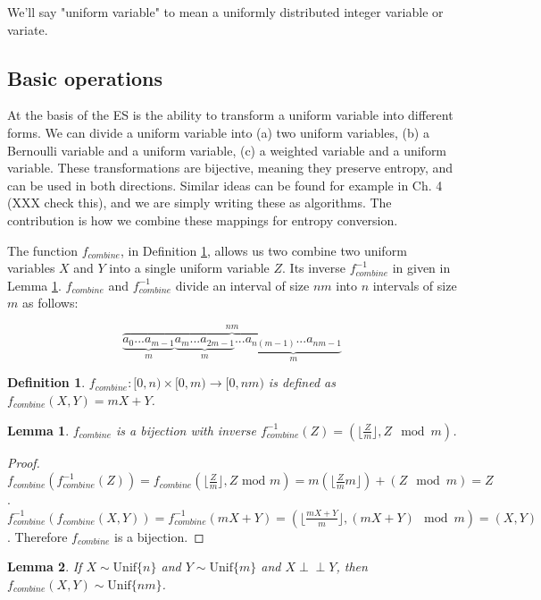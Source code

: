 \documentclass[12pt]{article}
\newtheorem{lemma}{Lemma}
\newtheorem{definition}{Definition}
\newcommand{\indep}{\perp\!\!\!\perp}
\newcommand{\unif}[1]{\mathrm{Unif}\{#1\}}
\begin{document}
We'll say "uniform variable" to mean a uniformly distributed integer variable or variate.


\subsection{Basic operations}

At the basis of the ES is the ability to transform a uniform variable into different forms.  We can divide a uniform variable into (a) two uniform variables, (b) a Bernoulli variable and a uniform variable, (c) a weighted variable and a uniform variable. These transformations are bijective, meaning they preserve entropy, and can be used in both directions. Similar ideas can be found for example in \cite{gentle2003random} Ch. 4 (XXX check this), and we are simply writing these as algorithms. The contribution is how we combine these mappings for entropy conversion.

The function $f_{combine}$, in Definition \ref{def:combine}, allows us two combine two uniform variables $X$ and $Y$ into a single uniform variable $Z$. Its inverse $f^{-1}_{combine}$ in given in Lemma \ref{lem:divide}. $f_{combine}$ and $f^{-1}_{combine}$ divide an interval of size $nm$ into $n$ intervals of size $m$ as follows:


\[
\overbrace{
        \underbrace{a_0 ... a_{m-1}}_{m}
        \underbrace{a_m ... a_{2m-1}}_{m}
        ...
        \underbrace{a_{n(m-1)}...a_{nm-1}}_{m} 
        }
        ^{nm}
\]

\begin{definition}
    $f_{combine}: [0,n)\times [0,m) \rightarrow [0,nm)$ is defined as $f_{combine}(X,Y) = mX+Y$.
    \label{def:combine}
\end{definition}

\begin{lemma}
    $f_{combine}$ is a bijection with inverse $f^{-1}_{combine}(Z) = (\lfloor \frac{Z}{m} \rfloor, Z \mod m)$.
    \label{lem:divide}
\end{lemma}

\begin{proof}
    $f_{combine}(f^{-1}_{combine}(Z)) = f_{combine}(\lfloor \frac{Z}{m}\rfloor, Z \text{ mod } m) = m(\lfloor \frac{Z}{m}m \rfloor) + (Z \mod m) = Z$. $f^{-1}_{combine}(f_{combine}(X,Y)) = f^{-1}_{combine}(mX+Y) = (\lfloor\frac{mX+Y}{m}\rfloor, (mX+Y)\mod m) = (X,Y)$. Therefore $f_{combine}$ is a bijection.
\end{proof}

\begin{lemma}
    If $X \sim \unif{n}$ and $Y \sim \unif{m}$ and $X \indep Y$, then 
    $f_{combine}(X,Y) \sim \unif{nm}$.
\end{lemma}
\end{document}
